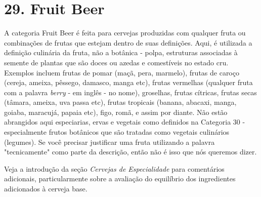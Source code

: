 \section*{29. Fruit Beer}

A categoria Fruit Beer é feita para cervejas produzidas com qualquer fruta ou combinações de frutas que estejam dentro de suas definições. Aqui, é utilizada a definição culinária da fruta, não a botânica - polpa, estruturas associadas à semente de plantas que são doces ou azedas e comestíveis no estado cru. Exemplos incluem frutas de pomar (maçã, pera, marmelo), frutas de caroço (cereja, ameixa, pêssego, damasco, manga etc), frutas vermelhas (qualquer fruta com a palavra \textit{berry} - em inglês - no nome), groselhas, frutas cítricas, frutas secas (tâmara, ameixa, uva passa etc), frutas tropicais (banana, abacaxi, manga, goiaba, maracujá, papaia etc), figo, romã, e assim por diante. Não estão abrangidos aqui especiarias, ervas e vegetais como definidos na Categoria 30 - especialmente frutos botânicos que são tratadas como vegetais culinários (legumes). Se você precisar justificar uma fruta utilizando a palavra "tecnicamente" como parte da descrição, então não é isso que nós queremos dizer.

Veja a introdução da seção \textit{Cervejas de Especialidade} para comentários adicionais, particularmente sobre a avaliação do equilíbrio dos ingredientes adicionados à cerveja base.
